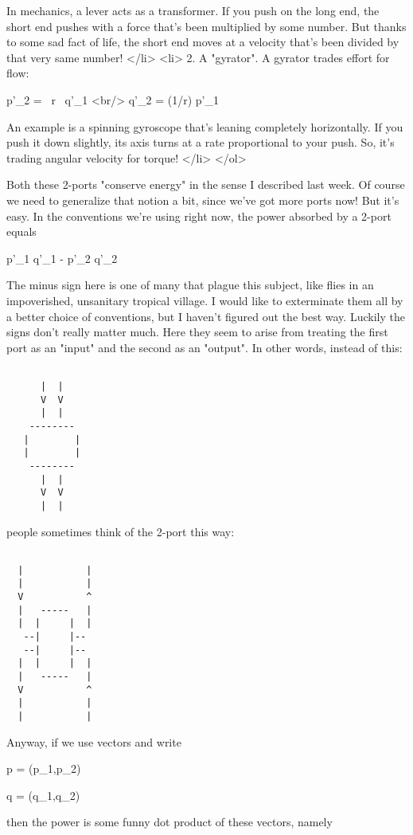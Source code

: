   In mechanics, a lever acts as a transformer.  If you push on the 
  long end, the short end pushes with a force that's been multiplied
  by some number.  But thanks to some sad fact of life, the short end
  moves at a velocity that's been divided by that very same number!
</li>
<li>
  2. A "gyrator".  A gyrator trades effort for flow:

  p'_{2} =  \  r \   q'_{1} <br/>
  q'_{2} = (1/r) p'_{1}

  An example is a spinning gyroscope that's leaning completely 
  horizontally.  If you push it down slightly, its axis turns 
  at a rate proportional to your push.  So, it's trading angular
  velocity for torque!
</li>
</ol>

Both these 2-ports "conserve energy" in the sense I described last
week.  Of course we need to generalize that notion a bit, since we've 
got more ports now!  But it's easy.  In the conventions we're using
right now, the power absorbed by a 2-port equals

p'_{1} q'_{1} - p'_{2} q'_{2}

The minus sign here is one of many that plague this subject, like
flies in an impoverished, unsanitary tropical village.  I would like
to exterminate them all by a better choice of conventions, but I
haven't figured out the best way.  Luckily the signs don't really
matter much.  Here they seem to arise from treating the first port as
an "input" and the second as an "output".  
In other words, instead of this:


\begin{verbatim}

      |  |
      V  V
      |  |
    --------
   |        |
   |        |
    --------
      |  |
      V  V
      |  |
\end{verbatim}
    

people sometimes think of the 2-port this way:


\begin{verbatim}

  |           |
  |           |
  V           ^
  |   -----   |
  |  |     |  |
   --|     |--
   --|     |--
  |  |     |  |
  |   -----   |
  V           ^
  |           |
  |           |
\end{verbatim}
    

Anyway, if we use vectors and write 

p = (p_{1},p_{2})

q = (q_{1},q_{2})

then the power is some funny dot product of these vectors, namely

